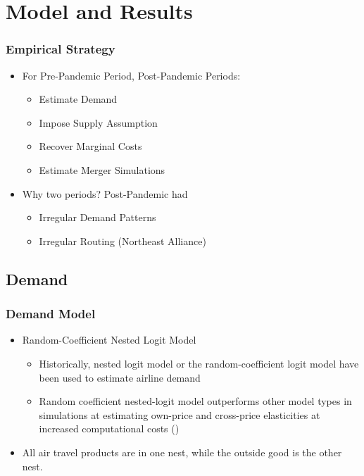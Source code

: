 \documentclass[xcolor=dvipsnames]{beamer}
\let\Oldsubsection\subsection
\renewcommand{\subsection}{\FloatBarrier\Oldsubsection}
\begin{document}
    \section{Model and Results}

    \begin{frame}
        \frametitle{Empirical Strategy}
        \begin{itemize}
            \item For Pre-Pandemic Period, Post-Pandemic Periods:
            \begin{itemize}
                \item Estimate Demand
                \item Impose Supply Assumption
                \item Recover Marginal Costs
                \item Estimate Merger Simulations
            \end{itemize}
            \item Why two periods? Post-Pandemic had
            \begin{itemize}
                \item Irregular Demand Patterns 
                \item Irregular Routing (Northeast Alliance)
            \end{itemize}
        \end{itemize}
    \end{frame}
    
    \subsection{Demand}
    \begin{frame}
        \frametitle{Demand Model}
        \begin{itemize}
            \item Random-Coefficient Nested Logit Model 
            \begin{itemize}
                \item Historically, nested logit model or the random-coefficient logit model have been used to estimate airline demand 
                \item Random coefficient nested-logit model outperforms other model types in simulations at estimating own-price and cross-price elasticities at increased computational costs (\cite{grigolon_nested_2014})
            \end{itemize}
            \item All air travel products are in one nest, while the outside good is the other nest. 
        \end{itemize}
    \end{frame}
    
\end{document}
